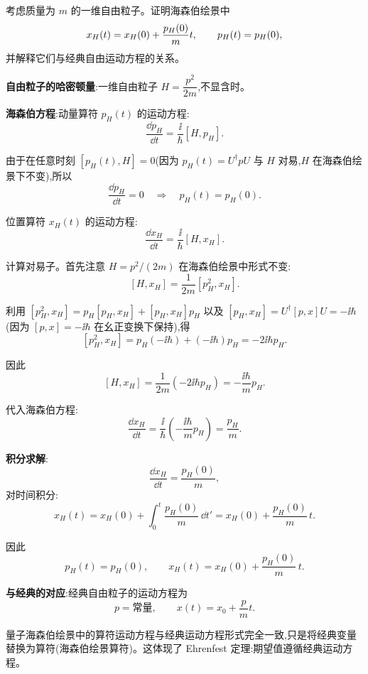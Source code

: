 \begin{question}
考虑质量为 $m$ 的一维自由粒子。证明海森伯绘景中
\[
x_H(t)=x_H(0)+{p_H(0)\over m}t,
\qquad
p_H(t)=p_H(0),
\]
并解释它们与经典自由运动方程的关系。
\begin{solution}
	\textbf{自由粒子的哈密顿量}:一维自由粒子 $H = \dfrac{p^2}{2m}$,不显含时。

	\textbf{海森伯方程}:动量算符 $p_H(t)$ 的运动方程:
	\[
	\frac{\dd p_H}{\dd t} = \frac{\ii}{\hbar}[H,p_H].
	\]

	由于在任意时刻 $[p_H(t),H]=0$(因为 $p_H(t)=U^\dagger p U$ 与 $H$ 对易,$H$ 在海森伯绘景下不变),所以
	\[
	\frac{\dd p_H}{\dd t} = 0 \quad\Longrightarrow\quad p_H(t) = p_H(0).
	\]

	位置算符 $x_H(t)$ 的运动方程:
	\[
	\frac{\dd x_H}{\dd t} = \frac{\ii}{\hbar}[H,x_H].
	\]

	计算对易子。首先注意 $H=p^2/(2m)$ 在海森伯绘景中形式不变:
	\[
	[H,x_H] = \frac{1}{2m}[p_H^2,x_H].
	\]

	利用 $[p_H^2,x_H] = p_H[p_H,x_H] + [p_H,x_H]p_H$ 以及 $[p_H,x_H] = U^\dagger[p,x]U = -\ii\hbar$(因为 $[p,x]=-\ii\hbar$ 在幺正变换下保持),得
	\[
	[p_H^2,x_H] = p_H(-\ii\hbar) + (-\ii\hbar)p_H = -2\ii\hbar p_H.
	\]

	因此
	\[
	[H,x_H] = \frac{1}{2m}(-2\ii\hbar p_H) = -\frac{\ii\hbar}{m}p_H.
	\]

	代入海森伯方程:
	\[
	\frac{\dd x_H}{\dd t} = \frac{\ii}{\hbar}\left(-\frac{\ii\hbar}{m}p_H\right) = \frac{p_H}{m}.
	\]

	\textbf{积分求解}:
	\[
	\frac{\dd x_H}{\dd t} = \frac{p_H(0)}{m},
	\]
	对时间积分:
	\[
	x_H(t) = x_H(0) + \int_0^t \frac{p_H(0)}{m}\,\dd t' = x_H(0) + \frac{p_H(0)}{m}\,t.
	\]

	因此
	\[
	\boxed{p_H(t) = p_H(0)},\qquad
	\boxed{x_H(t) = x_H(0) + \frac{p_H(0)}{m}\,t}.
	\]

	\textbf{与经典的对应}:经典自由粒子的运动方程为
	\[
	p = \text{常量},\qquad x(t) = x_0 + \frac{p}{m}t.
	\]

	量子海森伯绘景中的算符运动方程与经典运动方程形式完全一致,只是将经典变量替换为算符(海森伯绘景算符)。这体现了 Ehrenfest 定理:期望值遵循经典运动方程。
	\end{solution}
\end{question}

